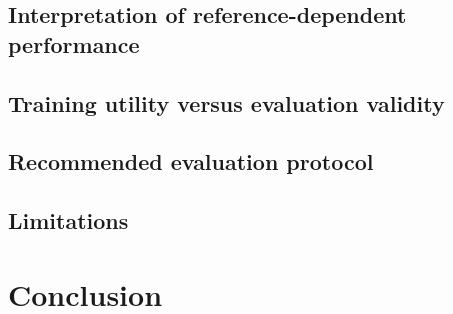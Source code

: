 \documentclass{elektr}
\begin{document}
\subsection*{Interpretation of reference-dependent performance}

\subsection*{Training utility versus evaluation validity}

\subsection*{Recommended evaluation protocol}

\subsection*{Limitations}

\section*{Conclusion} \label{sec:conclusion}
\end{document}
